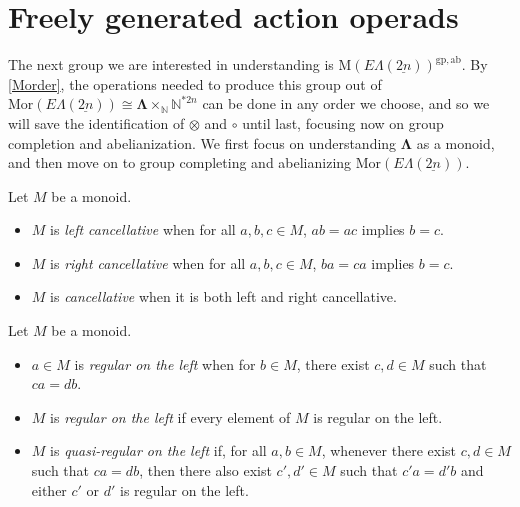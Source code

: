 \documentclass{amsbook} %
\newcommand{\ML}{\mathbf{\Lambda}}
\newcommand{\bigquotient}[2]{ \raisebox{0.75\height}{$#1$} \mkern-12mu\scalebox{2}{$\diagup$}\mkern-10mu \raisebox{-0.5\height}{$#2$} }
\newcommand{\ELnn}{E\Lambda(\underline{2n})}
\numberwithin{section}{chapter}
\begin{document}
%



\section{Freely generated action operads}

The next group we are interested in understanding is $\mathrm{M}(\ELnn)^{\mathrm{gp},\mathrm{ab}}$. By \cref{Morder}, the operations needed to produce this group out of $\mathrm{Mor}(\ELnn) \cong \ML \times_{\mathbb{N}} \mathbb{N}^{\ast 2n}$ can be done in any order we choose, and so we will save the identification of $\otimes$ and $\circ$ until last, focusing now on group completion and abelianization. We first focus on understanding $\ML$ as a monoid, and then move on to group completing and abelianizing $\mathrm{Mor}(\ELnn)$.

\begin{Defi}\label{cancellative}
Let $M$ be a monoid.
\begin{itemize}
\item $M$ is \emph{left cancellative} when for all $a, b, c \in M$, $ab = ac$ implies $b=c$.
\item $M$ is \emph{right cancellative} when for all $a, b, c \in M$, $ba = ca$ implies $b=c$.
\item $M$ is \emph{cancellative} when it is both left and right cancellative.
\end{itemize}
\end{Defi}

\begin{Defi}\label{quasireg}
Let $M$ be a monoid.
\begin{itemize}
\item $a \in M$ is \emph{regular on the left} when for $b \in M$, there exist $c, d \in M$ such that $ca = db$. 
\item $M$ is \emph{regular on the left} if every element of $M$ is regular on the left.
\item $M$ is \emph{quasi-regular on the left} if, for all $a, b \in M$, whenever there exist $c, d \in M$ such that $ca = db$, then there also exist $c', d' \in M$ such that $c'a = d'b$ and either $c'$ or $d'$ is regular on the left.
\end{itemize}
\end{Defi}
\end{document}
